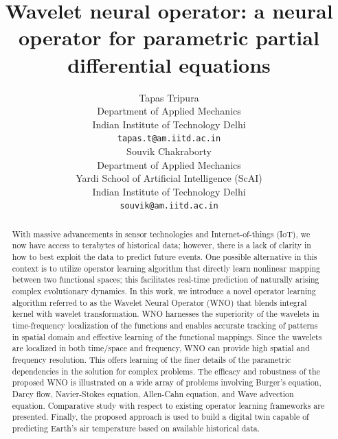 \documentclass{article}
\title{Wavelet neural operator: a neural operator for parametric partial differential equations}
\author{Tapas Tripura\\
  Department of Applied Mechanics\\
  Indian Institute of Technology Delhi\\
  \texttt{tapas.t@am.iitd.ac.in} \\
  \And
      Souvik Chakraborty \\
  Department of Applied Mechanics\\
  Yardi School of Artificial Intelligence (ScAI)\\
  Indian Institute of Technology Delhi\\
  \texttt{souvik@am.iitd.ac.in} \\
}
\begin{document}
\maketitle

\begin{abstract}
With massive advancements in sensor technologies and Internet-of-things (IoT), we now have access to terabytes of historical data; however, there is a lack of clarity in how to best exploit the data to predict future events. One possible alternative in this context is to utilize operator learning algorithm that directly learn nonlinear mapping between two functional spaces; this facilitates real-time prediction of naturally arising complex evolutionary dynamics. In this work, we introduce a novel operator learning algorithm referred to as the Wavelet Neural Operator (WNO) that blends integral kernel with wavelet transformation. WNO harnesses the superiority of the wavelets in time-frequency localization of the functions and enables accurate tracking of patterns in spatial domain and effective learning of the functional mappings. Since the wavelets are localized in both time/space and frequency, WNO can provide high spatial and frequency resolution. This offers learning of the finer details of the parametric dependencies in the solution for complex problems. The efficacy and robustness of the proposed WNO is illustrated on a wide array of problems involving Burger’s equation, Darcy flow, Navier-Stokes equation, Allen-Cahn equation, and Wave advection equation. Comparative study with respect to existing operator learning frameworks are presented. Finally, the proposed approach is used to build a digital twin capable of predicting Earth’s air temperature based on available historical data.
\end{abstract}

\end{document}
